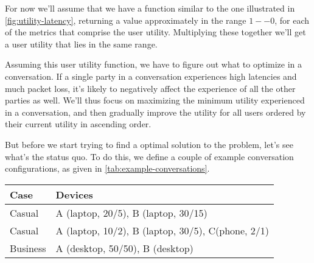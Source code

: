 For now we'll assume that we have a function similar to the one illustrated in \autoref{fig:utility-latency}, returning a value approximately in the range \(1 -- 0\), for each of the metrics that comprise the user utility. Multiplying these together we'll get a user utility that lies in the same range.

Assuming this user utility function, we have to figure out what to optimize in a conversation. If a single party in a conversation experiences high latencies and much packet loss, it's likely to negatively affect the experience of all the other parties as well. We'll thus focus on maximizing the minimum utility experienced in a conversation, and then gradually improve the utility for all users ordered by their current utility in ascending order.

But before we start trying to find a optimal solution to the problem, let's see what's the status quo. To do this, we define a couple of example conversation configurations, as given in \autoref{tab:example-conversations}.

\begin{center}
    \label{tab:example-conversations}
    \begin{tabular}{| l | l |}
    \hline
    \textbf{Case} & \textbf{Devices} \\ \hline
    Casual & A (laptop, 20/5), B (laptop, 30/15) \\ \hline
    Casual & A (laptop, 10/2), B (laptop, 30/5), C(phone, 2/1) \\ \hline
    Business & A (desktop, 50/50), B (desktop) \\ \hline
    \end{tabular}
\end{center}

